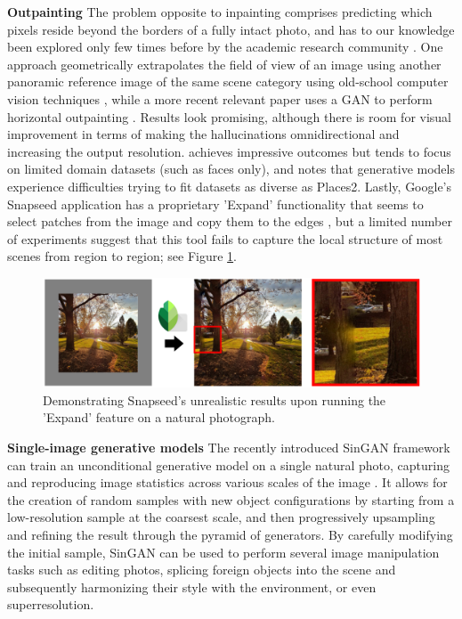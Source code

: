 \documentclass[twocolumn,showpacs,%
  nofootinbib,aps,superscriptaddress,%
  eqsecnum,prd,notitlepage,showkeys,10pt]{revtex4-1}
\begin{document}
\textbf{Outpainting} \hspace{0.3cm}
The problem opposite to inpainting comprises predicting which pixels reside beyond the borders of a fully intact photo, and has to our knowledge been explored only few times before by the academic research community \cite{Zhang2013, Sabini2018, Wang2019}. One approach geometrically extrapolates the field of view of an image using another panoramic reference image of the same scene category using old-school computer vision techniques \cite{Zhang2013}, while a more recent relevant paper uses a GAN to perform horizontal outpainting \cite{Sabini2018}. Results look promising, although there is room for visual improvement in terms of making the hallucinations omnidirectional and increasing the output resolution. \cite{Wang2019} achieves impressive outcomes but tends to focus on limited domain datasets (such as faces only), and notes that generative models experience difficulties trying to fit datasets as diverse as Places2. Lastly, Google's Snapseed application has a proprietary 'Expand' functionality that seems to select patches from the image and copy them to the edges \cite{snapseed}, but a limited number of experiments suggest that this tool fails to capture the local structure of most scenes from region to region; see Figure \ref{fig:snapseed_fail}.

\begin{figure}[tp]
\centering
  \begin{adjustbox}{center}
  \includegraphics[width=\columnwidth]{snapseed1_fail}
  \end{adjustbox}
  \caption{Demonstrating Snapseed's \cite{snapseed} unrealistic results upon running the 'Expand' feature on a natural photograph.}
  \label{fig:snapseed_fail}
\end{figure}

\textbf{Single-image generative models} \hspace{0.3cm}
The recently introduced SinGAN framework can train an unconditional generative model on a single natural photo, capturing and reproducing image statistics across various scales of the image \cite{Shaham2019}. It allows for the creation of random samples with new object configurations by starting from a low-resolution sample at the coarsest scale, and then progressively upsampling and refining the result through the pyramid of generators. By carefully modifying the initial sample, SinGAN can be used to perform several image manipulation tasks such as editing photos, splicing foreign objects into the scene and subsequently harmonizing their style with the environment, or even superresolution.
\end{document}
